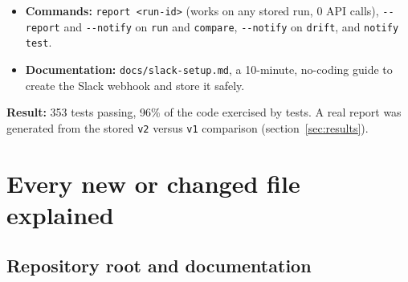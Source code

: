 \documentclass[11pt,a4paper]{article}
\newcommand{\code}[1]{\nolinkurl{#1}}
\begin{document}
\begin{itemize}
\begin{itemize}
          \item notifications are \textbf{opt-in}: only sent with \texttt{-{}-notify}, and only
                for the events listed in \code{regguard.yaml} (default: fail, error, drift;
                warn can be added);
          \item the webhook address is a secret, read only from the environment (\code{.env}
                locally, a GitHub secret in CI). It is never printed, even in error messages,
                and only \texttt{https://} addresses are accepted;
          \item all text is escaped so that a name like \texttt{<!channel>} cannot notify the
                whole channel;
          \item a Slack failure is reported as a warning and \textbf{never changes the verdict
                or the exit code}.
        \end{itemize}
  \item \textbf{Commands:} \texttt{report <run-id>} (works on any stored run, 0 API calls),
        \texttt{-{}-report} and \texttt{-{}-notify} on \texttt{run} and \texttt{compare},
        \texttt{-{}-notify} on \texttt{drift}, and \texttt{notify test}.
  \item \textbf{Documentation:} \code{docs/slack-setup.md}, a 10-minute, no-coding guide to
        create the Slack webhook and store it safely.
\end{itemize}
\textbf{Result:} 353 tests passing, 96\% of the code exercised by tests. A real report was
generated from the stored \code{v2} versus \code{v1} comparison (section~\ref{sec:results}).

\section{Every new or changed file explained}

\subsection{Repository root and documentation}
\end{document}
